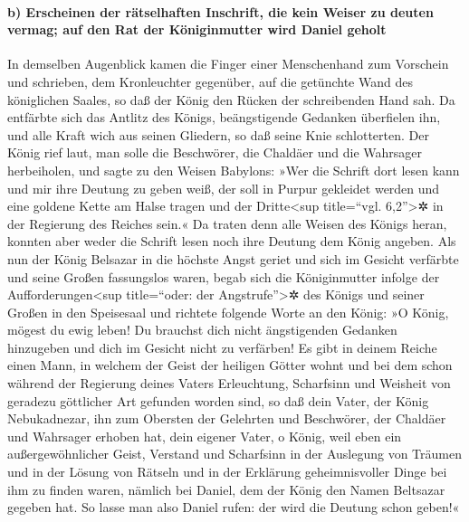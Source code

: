 \hypertarget{b-erscheinen-der-ruxe4tselhaften-inschrift-die-kein-weiser-zu-deuten-vermag-auf-den-rat-der-kuxf6niginmutter-wird-daniel-geholt}{%
\paragraph{b) Erscheinen der rätselhaften Inschrift, die kein Weiser zu
deuten vermag; auf den Rat der Königinmutter wird Daniel
geholt}\label{b-erscheinen-der-ruxe4tselhaften-inschrift-die-kein-weiser-zu-deuten-vermag-auf-den-rat-der-kuxf6niginmutter-wird-daniel-geholt}}

In demselben Augenblick kamen die Finger einer
Menschenhand zum Vorschein und schrieben, dem Kronleuchter gegenüber,
auf die getünchte Wand des königlichen Saales, so daß der König den
Rücken der schreibenden Hand sah. Da entfärbte sich das
Antlitz des Königs, beängstigende Gedanken überfielen ihn, und alle
Kraft wich aus seinen Gliedern, so daß seine Knie schlotterten.
Der König rief laut, man solle die Beschwörer, die
Chaldäer und die Wahrsager herbeiholen, und sagte zu den Weisen
Babylons: »Wer die Schrift dort lesen kann und mir ihre Deutung zu geben
weiß, der soll in Purpur gekleidet werden und eine goldene Kette am
Halse tragen und der Dritte\textless sup title=``vgl. 6,2''\textgreater✲
in der Regierung des Reiches sein.« Da traten denn alle
Weisen des Königs heran, konnten aber weder die Schrift lesen noch ihre
Deutung dem König angeben. Als nun der König Belsazar in
die höchste Angst geriet und sich im Gesicht verfärbte und seine Großen
fassungslos waren, begab sich die Königinmutter infolge
der Aufforderungen\textless sup title=``oder: der
Angstrufe''\textgreater✲ des Königs und seiner Großen in den Speisesaal
und richtete folgende Worte an den König: »O König, mögest du ewig
leben! Du brauchst dich nicht ängstigenden Gedanken hinzugeben und dich
im Gesicht nicht zu verfärben! Es gibt in deinem Reiche
einen Mann, in welchem der Geist der heiligen Götter wohnt und bei dem
schon während der Regierung deines Vaters Erleuchtung, Scharfsinn und
Weisheit von geradezu göttlicher Art gefunden worden sind, so daß dein
Vater, der König Nebukadnezar, ihn zum Obersten der Gelehrten und
Beschwörer, der Chaldäer und Wahrsager erhoben hat, dein eigener Vater,
o König, weil eben ein außergewöhnlicher Geist, Verstand
und Scharfsinn in der Auslegung von Träumen und in der Lösung von
Rätseln und in der Erklärung geheimnisvoller Dinge bei ihm zu finden
waren, nämlich bei Daniel, dem der König den Namen Beltsazar gegeben
hat. So lasse man also Daniel rufen: der wird die Deutung schon geben!«

